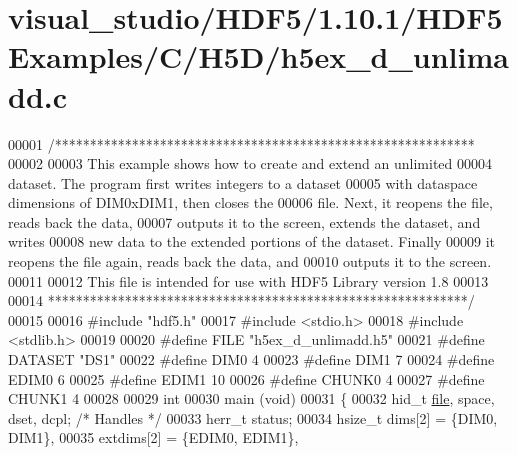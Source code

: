 \hypertarget{visual__studio_2_h_d_f5_21_810_81_2_h_d_f5_examples_2_c_2_h5_d_2h5ex__d__unlimadd_8c_source}{}\section{visual\+\_\+studio/\+H\+D\+F5/1.10.1/\+H\+D\+F5\+Examples/\+C/\+H5\+D/h5ex\+\_\+d\+\_\+unlimadd.c}
\label{visual__studio_2_h_d_f5_21_810_81_2_h_d_f5_examples_2_c_2_h5_d_2h5ex__d__unlimadd_8c_source}

\begin{DoxyCode}
00001 \textcolor{comment}{/************************************************************}
00002 \textcolor{comment}{}
00003 \textcolor{comment}{  This example shows how to create and extend an unlimited}
00004 \textcolor{comment}{  dataset.  The program first writes integers to a dataset}
00005 \textcolor{comment}{  with dataspace dimensions of DIM0xDIM1, then closes the}
00006 \textcolor{comment}{  file.  Next, it reopens the file, reads back the data,}
00007 \textcolor{comment}{  outputs it to the screen, extends the dataset, and writes}
00008 \textcolor{comment}{  new data to the extended portions of the dataset.  Finally}
00009 \textcolor{comment}{  it reopens the file again, reads back the data, and}
00010 \textcolor{comment}{  outputs it to the screen.}
00011 \textcolor{comment}{}
00012 \textcolor{comment}{  This file is intended for use with HDF5 Library version 1.8}
00013 \textcolor{comment}{}
00014 \textcolor{comment}{ ************************************************************/}
00015 
00016 \textcolor{preprocessor}{#include "hdf5.h"}
00017 \textcolor{preprocessor}{#include <stdio.h>}
00018 \textcolor{preprocessor}{#include <stdlib.h>}
00019 
00020 \textcolor{preprocessor}{#define FILE            "h5ex\_d\_unlimadd.h5"}
00021 \textcolor{preprocessor}{#define DATASET         "DS1"}
00022 \textcolor{preprocessor}{#define DIM0            4}
00023 \textcolor{preprocessor}{#define DIM1            7}
00024 \textcolor{preprocessor}{#define EDIM0           6}
00025 \textcolor{preprocessor}{#define EDIM1           10}
00026 \textcolor{preprocessor}{#define CHUNK0          4}
00027 \textcolor{preprocessor}{#define CHUNK1          4}
00028 
00029 \textcolor{keywordtype}{int}
00030 main (\textcolor{keywordtype}{void})
00031 \{
00032     hid\_t           \hyperlink{structfile}{file}, space, dset, dcpl;    \textcolor{comment}{/* Handles */}
00033     herr\_t          status;
00034     hsize\_t         dims[2] = \{DIM0, DIM1\},
00035                     extdims[2] = \{EDIM0, EDIM1\},

\end{DoxyCode}
